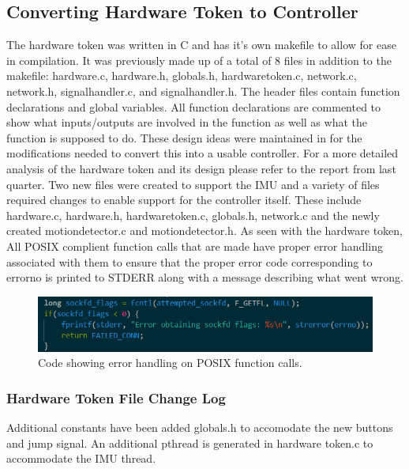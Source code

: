 \documentclass[a4paper,10pt]{article}
\begin{document}
\subsection{Converting Hardware Token to Controller}
The hardware token was written in C and has it's own makefile to allow for ease in compilation. It was previously made up of a total of 8 files in addition to the makefile: hardware.c, hardware.h, globals.h, hardware\textunderscore token.c, network.c, network.h, signal\textunderscore handler.c, and signal\textunderscore handler.h. The header files contain function declarations and global variables. All function declarations are commented to show what inputs/outputs are involved in the function as well as what the function is supposed to do. These design ideas were maintained in for the modifications needed to convert this into a usable controller. For a more detailed analysis of the hardware token and its design please refer to the report from last quarter. Two new files were created to support the IMU and a variety of files required changes to enable support for the controller itself. These include hardware.c, hardware.h, hardware\textunderscore token.c, globals.h, network.c and the newly created motion\textunderscore detector.c and motion\textunderscore detector.h. As seen with the hardware token, All POSIX complient function calls that are made have proper error handling associated with them to ensure that the proper error code corresponding to errorno is printed to STDERR along with a message describing what went wrong. 

\begin{figure}[H]
  \centering
      \includegraphics[width=\textwidth]{Assets/fcntl.png}
  \caption{Code showing error handling on POSIX function calls.}
\end{figure}

\subsubsection{Hardware Token File Change Log}
Additional constants have been added globals.h to accomodate the new buttons and jump signal. An additional pthread is generated in hardware \textunderscore token.c to accommodate the IMU thread. 
\end{document}
